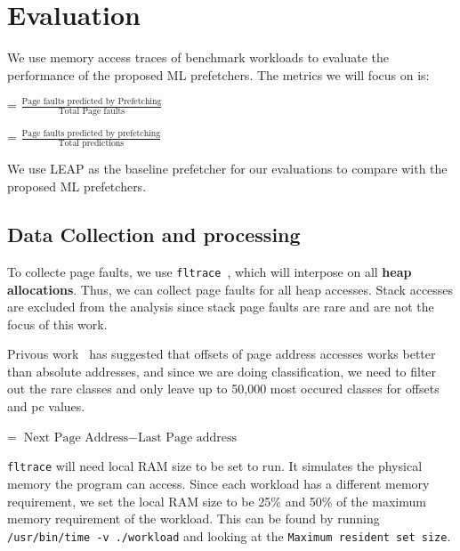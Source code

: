 
\section{Evaluation}
\label{sec:5}

We use memory access traces of benchmark workloads to evaluate the performance of the proposed ML prefetchers. The metrics we will focus on is:

\begin{definition}
     = $\frac{\text{Page faults predicted by Prefetching}}{\text{Total Page faults}}$
\end{definition}

\begin{definition}
     = $\frac{\text{Page faults predicted by prefetching}}{\text{Total predictions}}$
\end{definition}

We use LEAP\cite{leap} as the baseline prefetcher for our evaluations to compare with the proposed ML prefetchers. 

\subsection{Data Collection and processing}

To collecte page faults, we use \texttt{fltrace}~\cite{fltrace}, which will interpose on all \textbf{heap allocations}. Thus, we can collect page faults for all heap accesses. Stack accesses are excluded from the analysis since stack page faults are rare and are not the focus of this work.

Privous work~\cite{LMAP} has suggested that offsets of page address accesses works better than absolute addresses, and since we are doing classification, we need to filter out the rare classes and only leave up to 50,000 most occured classes for offsets and pc values.

\begin{definition}
     = $\text{Next Page Address} - \text{Last Page address}$
\end{definition}

\texttt{fltrace} will need local RAM size to be set to run. It simulates the physical memory the program can access. Since each workload has a different memory requirement, we set the local RAM size to be 25\% and 50\% of the maximum memory requirement of the workload. This can be found by running \texttt{/usr/bin/time -v ./workload} and looking at the \texttt{Maximum resident set size}.

